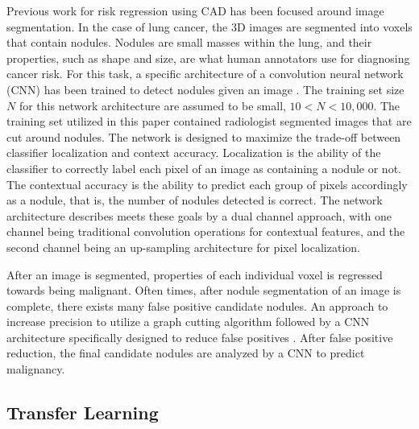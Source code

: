 \documentclass[conference,11pt]{IEEEtran}
\begin{document}
Previous work for risk regression using CAD has been focused around image segmentation. In the case of lung cancer, the 3D images are segmented into voxels that contain nodules. Nodules are small masses within the lung, and their properties, such as shape and size, are what human annotators use for diagnosing cancer risk. For this task, a specific architecture of a convolution neural network (CNN) has been trained to detect nodules given an image \cite{ronneberger_u-net:_2015}. The training set size $N$ for this network architecture are assumed to be small, $10 < N < 10,000$. The training set utilized in this paper contained radiologist segmented images that are cut around nodules. The network is designed to maximize the trade-off between classifier localization and context accuracy. Localization is the ability of the classifier to correctly label each pixel of an image as containing a nodule or not. The contextual accuracy is the ability to predict each group of pixels accordingly as a nodule, that is, the number of nodules detected is correct. The network architecture describes meets these goals by a dual channel approach, with one channel being traditional convolution operations for contextual features, and the second channel being an up-sampling architecture for pixel localization.

After an image is segmented, properties of each individual voxel is regressed towards being malignant. Often times, after nodule segmentation of an image is complete, there exists many false positive candidate nodules. An approach to increase precision to utilize a graph cutting algorithm followed by a CNN architecture specifically designed to reduce false positives \cite{sun_automatic_2017}. After false positive reduction, the final candidate nodules are analyzed by a CNN to predict malignancy.

\subsection{Transfer Learning}
\end{document}

